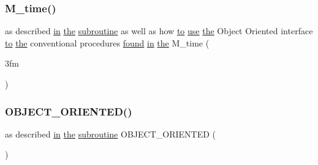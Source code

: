 \mbox{\label{M__time_83_8txt_a9591ef7ca68b7656bfd5560ed8d81293}} 
\subsubsection{\texorpdfstring{M\+\_\+time()}{M\_time()}\hspace{0.1cm}{\footnotesize\ttfamily [2/2]}}
{\footnotesize\ttfamily as described \hyperlink{M__journal_83_8txt_afce72651d1eed785a2132bee863b2f38}{in} \hyperlink{M__stopwatch_83_8txt_a0f266597de2e57eb3aa964927bb30e14}{the} \hyperlink{M__stopwatch_83_8txt_acfbcff50169d691ff02d4a123ed70482}{subroutine} as well as how \hyperlink{M__stopwatch_83_8txt_a97209fd3e34ef701c0a9734280779cbb}{to} \hyperlink{intro__blas1_83_8txt_a04fa2694d85f67a675bb3f45f7241f48}{use} \hyperlink{M__stopwatch_83_8txt_a0f266597de2e57eb3aa964927bb30e14}{the} Object Oriented interface \hyperlink{M__stopwatch_83_8txt_a97209fd3e34ef701c0a9734280779cbb}{to} \hyperlink{M__stopwatch_83_8txt_a0f266597de2e57eb3aa964927bb30e14}{the} conventional procedures \hyperlink{what__overview_81_8txt_a4a5cd559ce9a19bdc777ce034bc845d1}{found} \hyperlink{M__journal_83_8txt_afce72651d1eed785a2132bee863b2f38}{in} \hyperlink{M__stopwatch_83_8txt_a0f266597de2e57eb3aa964927bb30e14}{the} M\+\_\+time (\begin{DoxyParamCaption}\item[{3fm}]{ }\end{DoxyParamCaption})}

\mbox{\label{M__time_83_8txt_a82d408d5c398e54b1461070b826ef70e}} 
\subsubsection{\texorpdfstring{O\+B\+J\+E\+C\+T\+\_\+\+O\+R\+I\+E\+N\+T\+E\+D()}{OBJECT\_ORIENTED()}}
{\footnotesize\ttfamily as described \hyperlink{M__journal_83_8txt_afce72651d1eed785a2132bee863b2f38}{in} \hyperlink{M__stopwatch_83_8txt_a0f266597de2e57eb3aa964927bb30e14}{the} \hyperlink{M__stopwatch_83_8txt_acfbcff50169d691ff02d4a123ed70482}{subroutine} O\+B\+J\+E\+C\+T\+\_\+\+O\+R\+I\+E\+N\+T\+ED (\begin{DoxyParamCaption}{ }\end{DoxyParamCaption})}



